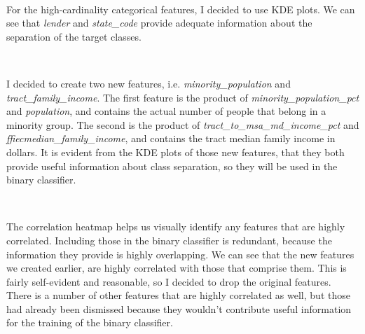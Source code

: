 \documentclass[11pt]{article}
\begin{document}
    \begin{center}
    \end{center}
    { \hspace*{\fill} \\}
    
    For the high-cardinality categorical features, I decided to use KDE
plots. We can see that \emph{lender} and \emph{state\_code} provide
adequate information about the separation of the target classes.	
\pagebreak

    \begin{center}
    \end{center}
    { \hspace*{\fill} \\}
    
    I decided to create two new features, i.e. \emph{minority\_population}
and \emph{tract\_family\_income}. The first feature is the product of
\emph{minority\_population\_pct} and \emph{population}, and contains the
actual number of people that belong in a minority group. The second is
the product of \emph{tract\_to\_msa\_md\_income\_pct} and
\emph{ffiecmedian\_family\_income}, and contains the tract median family
income in dollars. It is evident from the KDE plots of those new
features, that they both provide useful information about class
separation, so they will be used in the binary classifier.

    \begin{center}
    \end{center}
    { \hspace*{\fill} \\}
    
    The correlation heatmap helps us visually identify any features that are
highly correlated. Including those in the binary classifier is
redundant, because the information they provide is highly overlapping.
We can see that the
new features we created earlier, are highly correlated with those that
comprise them. This is fairly self-evident and reasonable, so I decided
to drop the original features. There is a number of other features that
are highly correlated as well, but those had already been dismissed because
they wouldn't contribute useful information for the training of the binary 
classifier.
\end{document}
